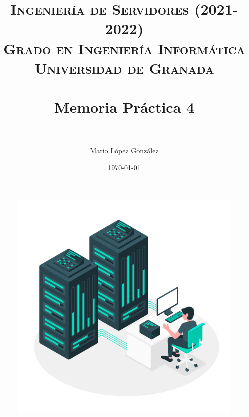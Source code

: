 

\title{	
\normalfont \normalsize 
\textsc{\textbf{Ingeniería de Servidores (2021-2022)} \\ Grado en Ingeniería Informática \\ Universidad de Granada} \\ [25pt] %
\horrule{0.5pt} \\[0.4cm] %
\huge Memoria Práctica 4 \\ %
\horrule{2pt} \\[0.5cm] %
}

\author{Mario López González} %

\date{\normalsize\today} %




\maketitle %

\begin{figure}[H]
    \centering
    \includegraphics[scale=0.175]{images/server.jpg}
    \label{fig:server}
\end{figure}

